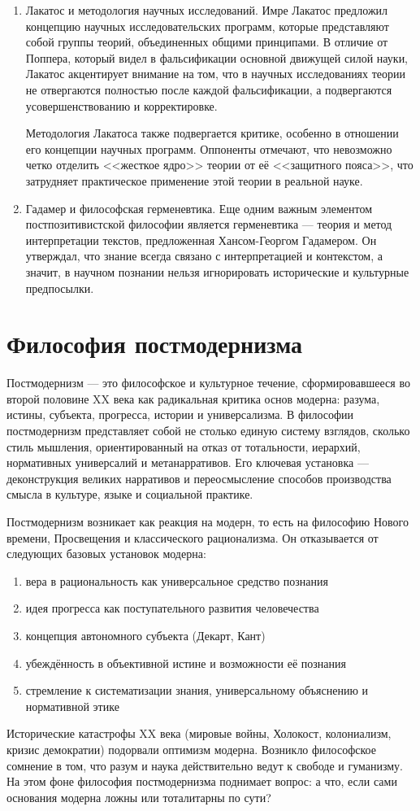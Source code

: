 \documentclass[12pt,a4paper]{article}
\begin{document}
\begin{enumerate}
		\item Лакатос и методология научных исследований. Имре Лакатос предложил концепцию научных исследовательских программ, которые представляют собой группы теорий, объединенных общими принципами. В отличие от Поппера, который видел в фальсификации основной движущей силой науки, Лакатос акцентирует внимание на том, что в научных исследованиях теории не отвергаются полностью после каждой фальсификации, а подвергаются усовершенствованию и корректировке.
		
		Методология Лакатоса также подвергается критике, особенно в отношении его концепции научных программ. Оппоненты отмечают, что невозможно четко отделить <<жесткое ядро>> теории от её <<защитного пояса>>, что затрудняет практическое применение этой теории в реальной науке.
		
		\item Гадамер и философская герменевтика. Еще одним важным элементом постпозитивистской философии является герменевтика — теория и метод интерпретации текстов, предложенная Хансом-Георгом Гадамером. Он утверждал, что знание всегда связано с интерпретацией и контекстом, а значит, в научном познании нельзя игнорировать исторические и культурные предпосылки.
	\end{enumerate}
	
	\section{Философия постмодернизма~\checkmark}
	Постмодернизм — это философское и культурное течение, сформировавшееся во второй половине XX века как радикальная критика основ модерна: разума, истины, субъекта, прогресса, истории и универсализма. В философии постмодернизм представляет собой не столько единую систему взглядов, сколько стиль мышления, ориентированный на отказ от тотальности, иерархий, нормативных универсалий и метанарративов. Его ключевая установка — деконструкция великих нарративов и переосмысление способов производства смысла в культуре, языке и социальной практике.
	
	Постмодернизм возникает как реакция на модерн, то есть на философию Нового времени, Просвещения и классического рационализма. Он отказывается от следующих базовых установок модерна:
	\begin{enumerate}
		\item вера в рациональность как универсальное средство познания
		\item идея прогресса как поступательного развития человечества
		\item концепция автономного субъекта (Декарт, Кант)
		\item убеждённость в объективной истине и возможности её познания
		\item стремление к систематизации знания, универсальному объяснению и нормативной этике
	\end{enumerate}
	Исторические катастрофы XX века (мировые войны, Холокост, колониализм, кризис демократии) подорвали оптимизм модерна. Возникло философское сомнение в том, что разум и наука действительно ведут к свободе и гуманизму. На этом фоне философия постмодернизма поднимает вопрос: а что, если сами основания модерна ложны или тоталитарны по сути?
\end{document}
